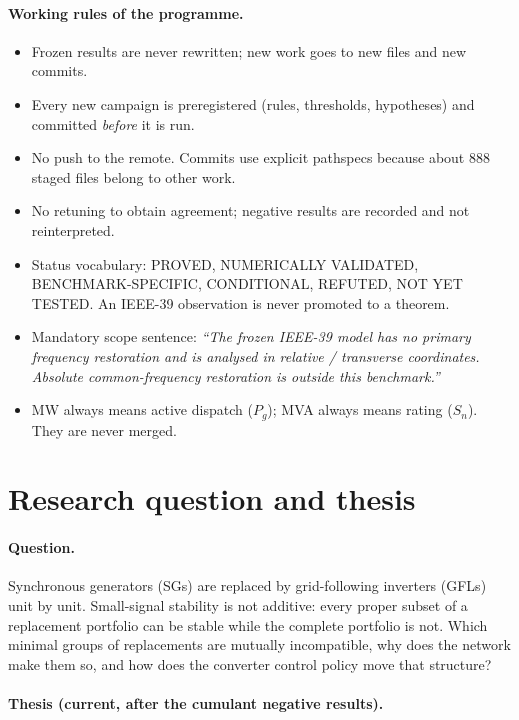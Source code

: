\documentclass[10pt,a4paper]{article}
\theoremstyle{definition}
\newcommand{\status}[1]{\textsf{\small #1}}
\begin{document}
\paragraph{Working rules of the programme.}
\begin{itemize}
\item Frozen results are never rewritten; new work goes to new files and new commits.
\item Every new campaign is preregistered (rules, thresholds, hypotheses) and committed \emph{before} it is run.
\item No push to the remote. Commits use explicit pathspecs because about 888 staged files belong to other work.
\item No retuning to obtain agreement; negative results are recorded and not reinterpreted.
\item Status vocabulary: \status{PROVED}, \status{NUMERICALLY VALIDATED}, \status{BENCHMARK-SPECIFIC},
      \status{CONDITIONAL}, \status{REFUTED}, \status{NOT YET TESTED}.
      An IEEE-39 observation is never promoted to a theorem.
\item Mandatory scope sentence: \emph{``The frozen IEEE-39 model has no primary frequency restoration and is
      analysed in relative / transverse coordinates. Absolute common-frequency restoration is outside this benchmark.''}
\item MW always means active dispatch ($P_g$); MVA always means rating ($S_n$). They are never merged.
\end{itemize}

\section{Research question and thesis}

\paragraph{Question.} Synchronous generators (SGs) are replaced by grid-following
inverters (GFLs) unit by unit. Small-signal stability is not additive: every
proper subset of a replacement portfolio can be stable while the complete
portfolio is not. Which minimal groups of replacements are mutually
incompatible, why does the network make them so, and how does the converter
control policy move that structure?

\paragraph{Thesis (current, after the cumulant negative results).}
\begin{center}
\end{center}
\end{document}
